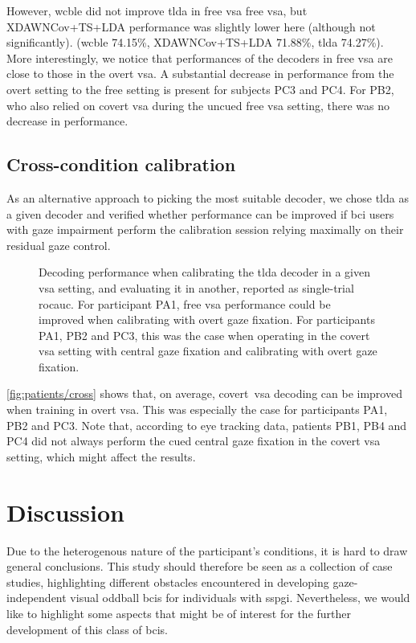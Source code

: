 However, \Ac{wcble} did not improve \ac{tlda} in free \ac{vsa} free \ac{vsa}, but
XDAWNCov+TS+LDA performance was slightly lower here (although not
significantly).
(\ac{wcble} 74.15\%, XDAWNCov+TS+LDA 71.88\%, \ac{tlda} 74.27\%).
More interestingly, we notice that performances of the decoders in free
\ac{vsa} are close to those in the overt \ac{vsa}.
A substantial decrease in performance from the overt setting to the free
setting is present for
subjects PC3 and PC4.
For PB2, who also relied on covert \ac{vsa} during the uncued free \ac{vsa}
setting, there was no decrease in performance.

\subsection{Cross-condition calibration}
\label{sec:patients/outcomes/cross}
As an alternative approach to picking the most suitable decoder, we chose
\ac{tlda} as a given decoder and verified whether performance can be improved
if \ac{bci} users with gaze impairment perform the calibration session relying
maximally on their residual gaze control.

\begin{figure}[t]
  
  \caption[Cross-setting calibration and decoding performance.]{
    Decoding performance when calibrating the \ac{tlda} decoder in a given \ac{vsa}
    setting, and evaluating it in another, reported as
    single-trial \ac{rocauc}.
    For participant PA1, free \ac{vsa} performance could be improved when
    calibrating with overt gaze fixation.
    For participants PA1, PB2 and PC3, this was the case when operating in the
    covert \ac{vsa} setting with central gaze fixation and calibrating with
    overt gaze fixation.
  }
  \label{fig:patients/cross}
\end{figure}

\autoref{fig:patients/cross} shows that, on average, covert~\ac{vsa} decoding
can be improved when training in overt \ac{vsa}.
This was especially the case for participants PA1, PB2 and PC3.
Note that, according to eye tracking data, patients PB1, PB4 and PC4 did not
always perform the cued central gaze fixation in the covert \ac{vsa} setting,
which might affect the results.

\section{Discussion}

Due to the heterogenous nature of the participant's conditions, it is hard to
draw general conclusions.
This study should therefore be seen as a collection of case studies,
highlighting different obstacles encountered in developing gaze-independent
visual oddball \acp{bci} for individuals with \ac{sspgi}.
Nevertheless, we would like to highlight some aspects that might be
of interest for the further development of this class of \acp{bci}.


